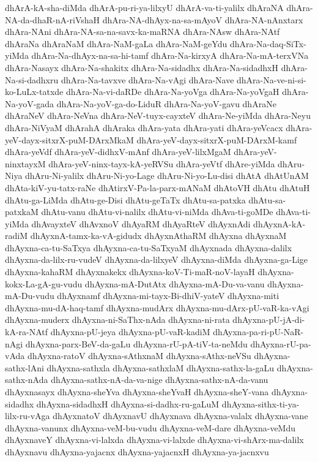 {dhArA-kA-sha-diMda
dhArA-pu-ri-ya-lilxyU
dhArA-va-ti-yalilx
dhAraNA
dhAra-NA-da-dhaR-nA-riVshaH
dhAra-NA-dhAyx-na-sa-mAyoV
dhAra-NA-nAnxtarx
dhAra-NAni
dhAra-NA-sa-na-savx-ka-maRNA
dhAra-NAsw
dhAra-NAtf
dhAraNa
dhAraNaM
dhAra-NaM-gaLa
dhAra-NaM-geYdu
dhAra-Na-daq-SiTx-yiMda
dhAra-Na-dhAyx-na-sa-hi-tamf
dhAra-Na-kirxyA
dhAra-Na-mA-terxVNa
dhAra-Nasayx
dhAra-Na-shakitx
dhAra-Na-sidadhx
dhAra-Na-sidadhxH
dhAra-Na-si-dadhxru
dhAra-Na-tavxve
dhAra-Na-vAgi
dhAra-Nave
dhAra-Na-ve-ni-si-ko-LuLx-tatxde
dhAra-Na-vi-daRDe
dhAra-Na-yoVga
dhAra-Na-yoVgaH
dhAra-Na-yoV-gada
dhAra-Na-yoV-ga-do-LiduR
dhAra-Na-yoV-gavu
dhAraNe
dhAraNeV
dhAra-NeVna
dhAra-NeV-tuyx-cayxteV
dhAra-Ne-yiMda
dhAra-Neyu
dhAra-NiVyaM
dhArahA
dhAraka
dhAra-yata
dhAra-yati
dhAra-yeVcacx
dhAra-yeV-dayx-sitxrX-puM-DArxMkaM
dhAra-yeV-dayx-sitxrX-puM-DArxM-kamf
dhAra-yeVdf
dhAra-yeV-didhxV-mAnf
dhAra-yeV-lilxMgaM
dhAra-yeV-ninxtayxM
dhAra-yeV-ninx-tayx-kA-yeRVSu
dhAra-yeVtf
dhAre-yiMda
dhAru-Niya
dhAru-Ni-yalilx
dhAru-Ni-yo-Lage
dhAru-Ni-yo-Lu-disi
dhAtA
dhAtUnAM
dhAta-kiV-yu-tatx-raNe
dhAtirxV-Pa-la-parx-mANaM
dhAtoVH
dhAtu
dhAtuH
dhAtu-ga-LiMda
dhAtu-ge-Disi
dhAtu-geTaTx
dhAtu-sa-patxka
dhAtu-sa-patxkaM
dhAtu-vanu
dhAtu-vi-nalilx
dhAtu-vi-niMda
dhAva-ti-goMDe
dhAva-ti-yiMda
dhAvayxteV
dhAvxnoV
dhAyaRM
dhAyaRteV
dhAyxnAdi
dhAyxnA-kA-radiM
dhAyxnA-tamx-ka-vA-gidudx
dhAyxnAthaRM
dhAyxna
dhAyxnaM
dhAyxna-ca-tu-SaTxya
dhAyxna-ca-tu-SaTxyaM
dhAyxnada
dhAyxna-dalilx
dhAyxna-da-lilx-ru-vudeV
dhAyxna-da-lilxyeV
dhAyxna-diMda
dhAyxna-ga-Lige
dhAyxna-kahaRM
dhAyxnakekx
dhAyxna-koV-Ti-maR-noV-layaH
dhAyxna-kokx-La-gA-gu-vudu
dhAyxna-mA-DutAtx
dhAyxna-mA-Du-va-vanu
dhAyxna-mA-Du-vudu
dhAyxnamf
dhAyxna-mi-tayx-Bi-dhiV-yateV
dhAyxna-miti
dhAyxna-mu-dA-haq-tamf
dhAyxna-mudArx
dhAyxna-mu-dArx-pU-vaR-ka-vAgi
dhAyxna-muderx
dhAyxna-ni-SaThx-nAda
dhAyxna-ni-rata
dhAyxna-pU-jA-di-kA-ra-NAtf
dhAyxna-pU-jeya
dhAyxna-pU-vaR-kadiM
dhAyxna-pa-ri-pU-NaR-nAgi
dhAyxna-parx-BeV-da-gaLu
dhAyxna-rU-pA-tiV-ta-neMdu
dhAyxna-rU-pa-vAda
dhAyxna-ratoV
dhAyxna-sAthxnaM
dhAyxna-sAthx-neVSu
dhAyxna-sathx-lAni
dhAyxna-sathxla
dhAyxna-sathxlaM
dhAyxna-sathx-la-gaLu
dhAyxna-sathx-nAda
dhAyxna-sathx-nA-da-va-nige
dhAyxna-sathx-nA-da-vanu
dhAyxnasayx
dhAyxna-sheYva
dhAyxna-sheYvaH
dhAyxna-sheY-vana
dhAyxna-sidadhx
dhAyxna-sidadhxH
dhAyxna-si-dadhx-ru-gaLuM
dhAyxna-sithx-ti-ya-lilx-ru-vAga
dhAyxnatoV
dhAyxnavU
dhAyxnava
dhAyxna-valalx
dhAyxna-vane
dhAyxna-vanunx
dhAyxna-veM-bu-vudu
dhAyxna-veM-dare
dhAyxna-veMdu
dhAyxnaveY
dhAyxna-vi-lalxda
dhAyxna-vi-lalxde
dhAyxna-vi-shArx-ma-dalilx
dhAyxnavu
dhAyxna-yajacnx
dhAyxna-yajacnxH
dhAyxna-ya-jacnxvu
}
